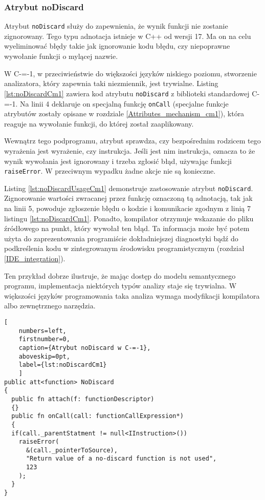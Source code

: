 \subsubsection{Atrybut noDiscard}
\label{no_discard}

Atrybut \lstinline{noDiscard} służy do zapewnienia, że wynik funkcji nie zostanie zignorowany.
Tego typu adnotacja istnieje w C++ od wersji 17\cite{ISO:cpp17}.
Ma on na celu wyeliminować błędy takie jak ignorowanie kodu błędu, czy niepoprawne wywołanie funkcji o mylącej nazwie.

W C-=-1, w przeciwieństwie do większości języków niskiego poziomu, stworzenie analizatora, który zapewnia taki niezmiennik, jest trywialne.
Listing \ref{lst:noDiscardCm1} zawiera kod atrybutu \lstinline{noDiscard} z biblioteki standardowej C-=-1.
Na linii 4 deklaruje on specjalną funkcję \lstinline{onCall} (specjalne funkcje atrybutów zostały opisane w rozdziale \ref{Attributes_mechanism_cm1}), która reaguje na wywołanie funkcji, do której został zaaplikowany.

Wewnątrz tego podprogramu, atrybut sprawdza, czy bezpośrednim rodzicem tego wyrażenia jest wyrażenie, czy instrukcja.
Jeśli jest nim instrukcja, oznacza to że wynik wywołania jest ignorowany i trzeba zgłosić błąd, używając funkcji \lstinline{raiseError}.
W przeciwnym wypadku żadne akcje nie są konieczne.

Listing \ref{lst:noDiscardUsageCm1} demonstruje zastosowanie atrybut \lstinline{noDiscard}.
Zignorowanie wartości zwracanej przez funkcję oznaczoną tą adnotacją, tak jak na linii 5, powoduje zgłoszenie błędu o kodzie i komunikacie zgodnym z linią 7 listingu \ref{lst:noDiscardCm1}.
Ponadto, kompilator otrzymuje wskazanie do pliku źródłowego na punkt, który wywołał ten błąd.
Ta informacja może być potem użyta do zaprezentowania programiście dokładniejszej diagnostyki bądź do podkreślenia kodu w zintegrowanym środowisku programistycznym (rozdział \ref{IDE_integration}).

Ten przykład dobrze ilustruje, że mając dostęp do modelu semantycznego programu, implementacja niektórych typów analizy staje się trywialna.
W większości języków programowania taka analiza wymaga modyfikacji kompilatora albo zewnętrznego narzędzia.

\begin{minipage}{\linewidth}
  
  \begin{lstlisting}[
    numbers=left,
    firstnumber=0,
    caption={Atrybut noDiscard w C-=-1},
    aboveskip=0pt,
    label={lst:noDiscardCm1}
    ]
public att<function> NoDiscard
{
  public fn attach(f: functionDescriptor)
  {}
  public fn onCall(call: functionCallExpression*)
  {
  if(call._parentStatment != null<IInstruction>())
    raiseError(
      &(call._pointerToSource), 
      "Return value of a no-discard function is not used",
      123
    );
  }
}
\end{lstlisting}
\end{minipage}


